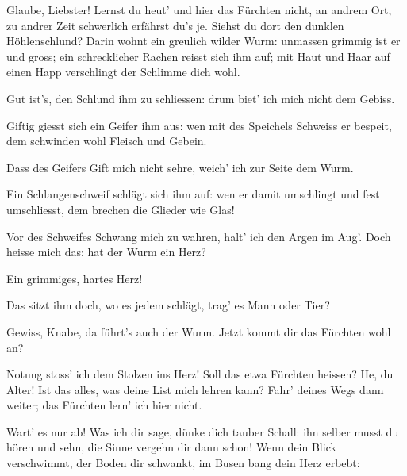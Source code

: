 \begin{drama}
\Mimespeaks


Glaube, Liebster!
Lernst du heut' und hier
das Fürchten nicht,
an andrem Ort,
zu andrer Zeit
schwerlich erfährst du's je.
Siehst du dort
den dunklen Höhlenschlund?
Darin wohnt
ein greulich wilder Wurm:
unmassen grimmig
ist er und gross;
ein schrecklicher Rachen
reisst sich ihm auf;
mit Haut und Haar
auf einen Happ
verschlingt der Schlimme dich wohl.

\Siegfriedspeaks


Gut ist's, den Schlund ihm zu schliessen:
drum biet' ich mich nicht dem Gebiss.

\Mimespeaks

Giftig giesst sich
ein Geifer ihm aus:
wen mit des Speichels
Schweiss er bespeit,
dem schwinden wohl Fleisch und Gebein.

\Siegfriedspeaks

Dass des Geifers Gift mich nicht sehre,
weich' ich zur Seite dem Wurm.

\Mimespeaks

Ein Schlangenschweif
schlägt sich ihm auf:
wen er damit umschlingt
und fest umschliesst,
dem brechen die Glieder wie Glas!

\Siegfriedspeaks

Vor des Schweifes Schwang mich zu wahren,
halt' ich den Argen im Aug'.
Doch heisse mich das:
hat der Wurm ein Herz?

\Mimespeaks

Ein grimmiges, hartes Herz!

\Siegfriedspeaks

Das sitzt ihm doch,
wo es jedem schlägt,
trag' es Mann oder Tier?

\Mimespeaks

Gewiss, Knabe,
da führt's auch der Wurm.
Jetzt kommt dir das Fürchten wohl an?

\Siegfriedspeaks


Notung stoss' ich
dem Stolzen ins Herz!
Soll das etwa Fürchten heissen?
He, du Alter!
Ist das alles,
was deine List
mich lehren kann?
Fahr' deines Wegs dann weiter;
das Fürchten lern' ich hier nicht.

\Mimespeaks

Wart' es nur ab!
Was ich dir sage,
dünke dich tauber Schall:
ihn selber musst du
hören und sehn,
die Sinne vergehn dir dann schon!
Wenn dein Blick verschwimmt,
der Boden dir schwankt,
im Busen bang
dein Herz erbebt:


\end{drama}
